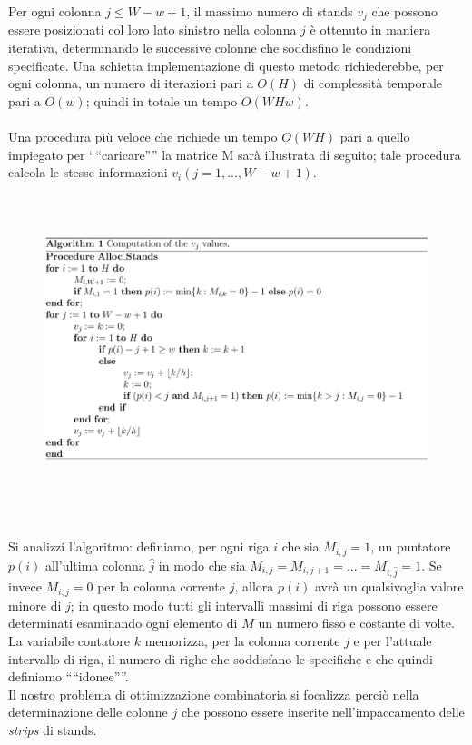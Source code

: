 \documentclass[12pt,a4paper,openright,twoside]{report}
\begin{document}
Per ogni colonna $j \leq W - w + 1$, il massimo numero di stands $v_{j}$ che possono essere posizionati col loro lato sinistro nella colonna $j$ \`{e} ottenuto in maniera iterativa, determinando le successive colonne che soddisfino le condizioni specificate.
Una schietta implementazione di questo metodo richiederebbe, per ogni colonna, un numero di iterazioni pari a $O(H)$ di complessit\`{a} temporale pari a $O(w)$; quindi in totale un tempo $O(W H w)$.\\
\\Una procedura pi\`{u} veloce che richiede un tempo $O(W H)$ pari a quello impiegato per "`"`caricare"'"' la matrice M sar\`{a} illustrata di seguito; tale procedura calcola le stesse informazioni $v_{i} (j=1,...,W-w+1)$.
\begin{figure}[h]
\flushleft
\includegraphics[width=14.8cm, height=9cm]{images/algorithm.eps}
\end{figure}
\\Si analizzi l'algoritmo: definiamo, per ogni riga $i$ che sia $M_{i,j}=1$, un puntatore $p(i)$ all'ultima colonna $\hat{j}$ in modo che sia $M_{i,j} = M_{i,j+1} = ... = M_{i, \hat{j}} = 1$. Se invece $M_{i,j}=0$ per la colonna corrente $j$, allora $p(i)$ avr\`{a} un qualsivoglia valore minore di $j$; in questo modo tutti gli intervalli massimi di riga possono essere determinati esaminando ogni elemento di $M$ un numero fisso e costante di volte. La variabile contatore $k$ memorizza, per la colonna corrente $j$ e per l'attuale intervallo di riga, il numero di righe che soddisfano le specifiche e che quindi definiamo "`"`idonee"'"'.\\
Il nostro problema di ottimizzazione combinatoria si focalizza perci\`{o} nella determinazione delle colonne $j$ che possono essere inserite nell'impaccamento delle \textit{strips} di stands.  
\end{document}
